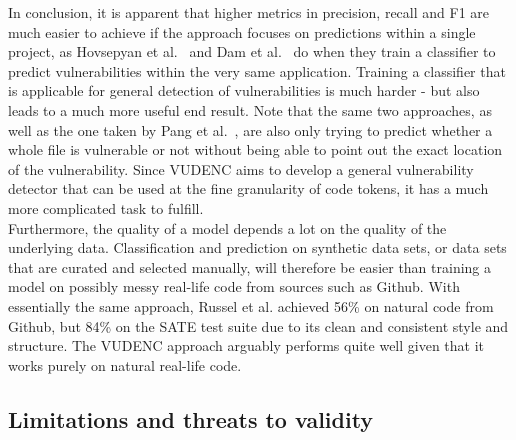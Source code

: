 \documentclass[
a4paper,
pagesize,
pdftex,
12pt,
twoside, %
BCOR=5mm, %
ngerman,
fleqn,
final,
]{scrartcl}
\begin{document}
	In conclusion, it is apparent that higher metrics in precision, recall and F1 are much easier to achieve if the approach focuses on predictions within a single project, as Hovsepyan et al.~\cite{Hovsepyan.2012} and Dam et al.~\cite{Dam.2017} do when they train a classifier to predict vulnerabilities within the very same application. Training a classifier that is applicable for general detection of vulnerabilities is much harder - but also leads to a much more useful end result. Note that the same two approaches, as well as the one taken by Pang et al.~\cite{Pang.2015}, are also only trying to predict whether a whole file is vulnerable or not without being able to point out the exact location of the vulnerability. Since VUDENC aims to develop a general vulnerability detector that can be used at the fine granularity of code tokens, it has a much more complicated task to fulfill.\\	
	Furthermore, the quality of a model depends a lot on the quality of the underlying data. Classification and prediction on synthetic data sets, or data sets that are curated and selected manually, will therefore be easier than training a model on possibly messy real-life code from sources such as Github. With essentially the same approach, Russel et al. achieved 56\% on natural code from Github, but 84\% on the SATE test suite due to its clean and consistent style and structure. The VUDENC approach arguably performs quite well given that it works purely on natural real-life code. 
	
	
	\subsection{Limitations and threats to validity}
	
\end{document}
